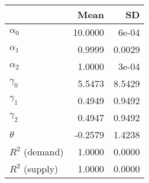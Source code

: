 
\begin{tabular}[t]{lrr}
\toprule
  & Mean & SD\\
\midrule
$\alpha_{0}$ & 10.0000 & 6e-04\\
$\alpha_{1}$ & 0.9999 & 0.0029\\
$\alpha_{2}$ & 1.0000 & 3e-04\\
$\gamma_{0}$ & 5.5473 & 8.5429\\
$\gamma_{1}$ & 0.4949 & 0.9492\\
$\gamma_{2}$ & 0.4947 & 0.9492\\
$\theta$ & -0.2579 & 1.4238\\
$R^{2}$ (demand) & 1.0000 & 0.0000\\
$R^{2}$ (supply) & 1.0000 & 0.0000\\
\bottomrule
\end{tabular}

